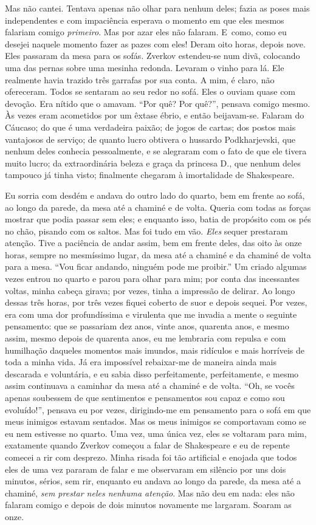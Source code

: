 Mas não cantei. Tentava apenas não olhar para nenhum deles; fazia as
poses mais independentes e com impaciência esperava o momento em que
eles mesmos falariam comigo \textit{primeiro}. Mas por azar eles não
falaram. \mbox{E como}, como eu desejei naquele momento fazer as pazes com
eles! Deram oito horas, depois nove. Eles passaram da mesa para os
sofás. Zverkov estendeu-se num divã, colocando uma das pernas sobre uma
mesinha redonda. Levaram o vinho para lá. Ele realmente havia trazido
três garrafas por sua conta. A mim, é claro, não ofereceram. Todos se
sentaram ao seu redor no sofá. Eles o ouviam quase com devoção. Era
nítido que o amavam. “Por quê? Por quê?”, pensava comigo mesmo. Às
vezes eram acometidos por um êxtase ébrio, e então beijavam-se. Falaram
do Cáucaso; do que é uma verdadeira paixão; de jogos de cartas; dos
postos mais vantajosos de serviço; de quanto lucro obtivera o hussardo
Podkharjevski, que nenhum deles conhecia pessoalmente, e se alegraram
com o fato de que ele tivera muito lucro; da extraordinária beleza e
graça da princesa D., que nenhum deles tampouco já tinha visto;
finalmente chegaram à imortalidade de Shakespeare.

Eu sorria com desdém e andava do outro lado do quarto, bem em frente ao sofá,
ao longo da parede, da mesa até a chaminé e de volta. Queria com todas as
forças mostrar que podia passar sem eles; e enquanto isso, batia de propósito
com os pés no chão, pisando com os saltos. Mas foi tudo em vão. \textit{Eles}
sequer prestaram atenção. Tive a paciência de andar assim, bem em frente deles,
das oito às onze horas, sempre no mesmíssimo lugar, da mesa até a chaminé e da
chaminé de volta para a mesa. “Vou ficar andando, ninguém pode me proibir.” Um
criado algumas vezes entrou no quarto e parou para olhar para mim; por conta
das incessantes voltas, minha cabeça girava; por vezes, tinha a impressão de
delirar. Ao longo dessas três horas, por três vezes fiquei coberto de suor e
depois sequei. Por vezes, era com uma dor profundíssima e virulenta que me
invadia a mente o seguinte pensamento: que se passariam dez anos, vinte anos,
quarenta anos, e mesmo assim, mesmo depois de quarenta anos, eu me lembraria
com repulsa e com humilhação daqueles momentos mais imundos, mais ridículos e
mais horríveis de toda a minha vida. Já era impossível rebaixar-me de maneira
ainda mais descarada e voluntária, e eu sabia disso perfeitamente,
perfeitamente, e mesmo assim continuava a caminhar da mesa até a chaminé e de
volta.  “Oh, se vocês apenas soubessem de que sentimentos e pensamentos sou
capaz e como sou evoluído!”, pensava eu por vezes, dirigindo-me em pensamento
para o sofá em que meus inimigos estavam sentados. Mas os meus inimigos se
comportavam como se eu nem estivesse no quarto. Uma vez, uma única vez, eles se
voltaram para mim, exatamente quando Zverkov começou a falar de Shakespeare e
eu de repente comecei a rir com desprezo. Minha risada foi tão artificial e
enojada que todos eles de uma vez pararam de falar e me observaram em silêncio
por uns dois minutos, sérios, sem rir, enquanto eu andava ao longo da parede,
da mesa até a chaminé, \textit{sem prestar neles nenhuma atenção}.  Mas não deu
em nada: eles não falaram comigo e depois de dois minutos novamente me
largaram. Soaram as onze.

